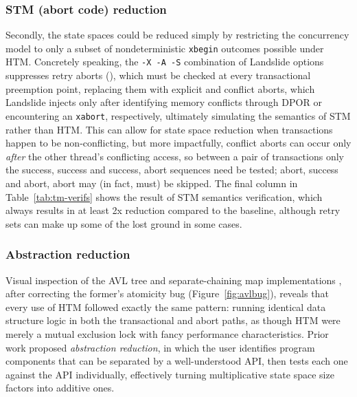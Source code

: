 \subsubsection{STM (abort code) reduction}
\label{sec:tm-eval-stm}

Secondly, the state spaces could be reduced
simply by restricting the concurrency model
to only a subset of nondeterministic {\tt xbegin} outcomes possible under HTM.
Concretely speaking,
the {\tt -X -A -S} combination of Landslide options
suppresses retry aborts
(\sect{\ref{sec:txn-abort-codes}}),
which must be checked at every transactional preemption point,
replacing them with explicit and conflict aborts,
which Landslide injects only after identifying memory conflicts through DPOR
or encountering an {\tt xabort},
respectively,
ultimately simulating the semantics of STM rather than HTM.
This can allow for state space reduction %
when transactions happen to be non-conflicting,
but more impactfully,
conflict aborts can occur only {\em after} the other thread's conflicting access,
so between a pair of transactions
only the success, success and success, abort sequences need be tested;
abort, success and abort, abort may (in fact, must) be skipped.
The final column in Table~\ref{tab:tm-verifs} shows the result of STM semantics verification,
which always results in at least 2x reduction compared to the baseline,
although retry sets can make up some of the lost ground in some cases.

\subsubsection{Abstraction reduction}
\label{sec:tm-abstraction}

Visual inspection of the AVL tree and separate-chaining map implementations \cite{tm-benchmark-cmu},
after correcting the former's atomicity bug (Figure~\ref{fig:avlbug}),
reveals that every use of HTM followed exactly the same pattern:
running identical data structure logic in both the transactional and abort paths,
as though HTM were merely a mutual exclusion lock with fancy performance characteristics.
Prior work \cite{dbug-phdthesis} proposed {\em abstraction reduction},
in which the user identifies program components that can be separated by a well-understood API,
then tests each one against the API individually,
effectively turning multiplicative state space size factors into additive ones.

